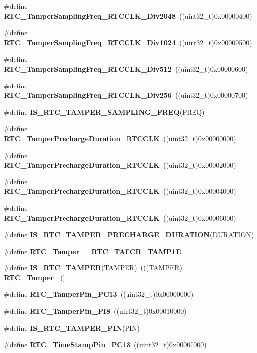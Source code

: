 \begin{DoxyCompactItemize}
\item 
\#define \textbf{ R\+T\+C\+\_\+\+Tamper\+Sampling\+Freq\+\_\+\+R\+T\+C\+C\+L\+K\+\_\+\+Div2048}~((uint32\+\_\+t)0x00000400)
\item 
\#define \textbf{ R\+T\+C\+\_\+\+Tamper\+Sampling\+Freq\+\_\+\+R\+T\+C\+C\+L\+K\+\_\+\+Div1024}~((uint32\+\_\+t)0x00000500)
\item 
\#define \textbf{ R\+T\+C\+\_\+\+Tamper\+Sampling\+Freq\+\_\+\+R\+T\+C\+C\+L\+K\+\_\+\+Div512}~((uint32\+\_\+t)0x00000600)
\item 
\#define \textbf{ R\+T\+C\+\_\+\+Tamper\+Sampling\+Freq\+\_\+\+R\+T\+C\+C\+L\+K\+\_\+\+Div256}~((uint32\+\_\+t)0x00000700)
\item 
\#define \textbf{ I\+S\+\_\+\+R\+T\+C\+\_\+\+T\+A\+M\+P\+E\+R\+\_\+\+S\+A\+M\+P\+L\+I\+N\+G\+\_\+\+F\+R\+EQ}(F\+R\+EQ)
\item 
\#define \textbf{ R\+T\+C\+\_\+\+Tamper\+Precharge\+Duration\+\_\+R\+T\+C\+C\+LK}~((uint32\+\_\+t)0x00000000)
\item 
\#define \textbf{ R\+T\+C\+\_\+\+Tamper\+Precharge\+Duration\+\_\+R\+T\+C\+C\+LK}~((uint32\+\_\+t)0x00002000)
\item 
\#define \textbf{ R\+T\+C\+\_\+\+Tamper\+Precharge\+Duration\+\_\+R\+T\+C\+C\+LK}~((uint32\+\_\+t)0x00004000)
\item 
\#define \textbf{ R\+T\+C\+\_\+\+Tamper\+Precharge\+Duration\+\_\+R\+T\+C\+C\+LK}~((uint32\+\_\+t)0x00006000)
\item 
\#define \textbf{ I\+S\+\_\+\+R\+T\+C\+\_\+\+T\+A\+M\+P\+E\+R\+\_\+\+P\+R\+E\+C\+H\+A\+R\+G\+E\+\_\+\+D\+U\+R\+A\+T\+I\+ON}(D\+U\+R\+A\+T\+I\+ON)
\item 
\#define \textbf{ R\+T\+C\+\_\+\+Tamper\+\_}~\textbf{ R\+T\+C\+\_\+\+T\+A\+F\+C\+R\+\_\+\+T\+A\+M\+P1E}
\item 
\#define \textbf{ I\+S\+\_\+\+R\+T\+C\+\_\+\+T\+A\+M\+P\+ER}(T\+A\+M\+P\+ER)~(((T\+A\+M\+P\+ER) == \textbf{ R\+T\+C\+\_\+\+Tamper\+\_}))
\item 
\#define \textbf{ R\+T\+C\+\_\+\+Tamper\+Pin\+\_\+\+P\+C13}~((uint32\+\_\+t)0x00000000)
\item 
\#define \textbf{ R\+T\+C\+\_\+\+Tamper\+Pin\+\_\+\+P\+I8}~((uint32\+\_\+t)0x00010000)
\item 
\#define \textbf{ I\+S\+\_\+\+R\+T\+C\+\_\+\+T\+A\+M\+P\+E\+R\+\_\+\+P\+IN}(P\+IN)
\item 
\#define \textbf{ R\+T\+C\+\_\+\+Time\+Stamp\+Pin\+\_\+\+P\+C13}~((uint32\+\_\+t)0x00000000)
\item 

\end{DoxyCompactItemize}
